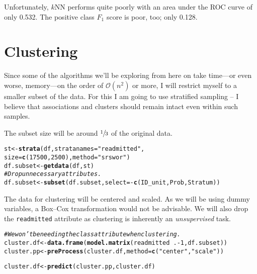 \documentclass{article}\usepackage[]{graphicx}\usepackage[]{color}
\makeatletter
\newcommand{\hlnum}[1]{\textcolor[rgb]{0.686,0.059,0.569}{#1}}%
\newcommand{\hlstr}[1]{\textcolor[rgb]{0.192,0.494,0.8}{#1}}%
\newcommand{\hlcom}[1]{\textcolor[rgb]{0.678,0.584,0.686}{\textit{#1}}}%
\newcommand{\hlopt}[1]{\textcolor[rgb]{0,0,0}{#1}}%
\newcommand{\hlstd}[1]{\textcolor[rgb]{0.345,0.345,0.345}{#1}}%
\newcommand{\hlkwb}[1]{\textcolor[rgb]{0.69,0.353,0.396}{#1}}%
\newcommand{\hlkwc}[1]{\textcolor[rgb]{0.333,0.667,0.333}{#1}}%
\newcommand{\hlkwd}[1]{\textcolor[rgb]{0.737,0.353,0.396}{\textbf{#1}}}%
\newenvironment{kframe}{%
 \def\at@end@of@kframe{}%
 \ifinner\ifhmode%
  \def\at@end@of@kframe{\end{minipage}}%
  \begin{minipage}{\columnwidth}%
 \fi\fi%
 \def\FrameCommand##1{\hskip\@totalleftmargin \hskip-\fboxsep
 \colorbox{shadecolor}{##1}\hskip-\fboxsep
     \hskip-\linewidth \hskip-\@totalleftmargin \hskip\columnwidth}%
 \MakeFramed {\advance\hsize-\width
   \@totalleftmargin\z@ \linewidth\hsize
   \@setminipage}}%
 {\par\unskip\endMakeFramed%
 \at@end@of@kframe}
\newenvironment{knitrout}{}{} %
\makeatother
\begin{document}
Unfortunately, $k$NN performs quite poorly with an area under the ROC curve of
only \num{0.532}.  The positive class $F_1$ score is poor, too; only
\num{0.128}.

\section{Clustering}\label{sec:cluster}

Since some of the algorithms we'll be exploring from here on take time---or even
worse, memory---on the order of $\mathcal O\left(n^2\right)$ or more, I will
restrict myself to a smaller subset of the data.  For this I am going to use
stratified sampling -- I believe that associations and clusters should remain
intact even within such samples.

The subset size will be around $\sfrac{1}{3}$ of the original data.

\begin{knitrout}
\color{fgcolor}\begin{kframe}
\begin{alltt}
\hlstd{st} \hlkwb{<-} \hlkwd{strata}\hlstd{(df,} \hlkwc{stratanames}\hlstd{=}\hlstr{"readmitted"}\hlstd{,}
             \hlkwc{size}\hlstd{=}\hlkwd{c}\hlstd{(}\hlnum{17500}\hlstd{,} \hlnum{2500}\hlstd{),} \hlkwc{method}\hlstd{=}\hlstr{"srswor"}\hlstd{)}
\hlstd{df.subset} \hlkwb{<-} \hlkwd{getdata}\hlstd{(df, st)}
\hlcom{# Drop unnecessary attributes.}
\hlstd{df.subset} \hlkwb{<-} \hlkwd{subset}\hlstd{(df.subset,} \hlkwc{select}\hlstd{=}\hlopt{-}\hlkwd{c}\hlstd{(ID_unit, Prob, Stratum))}
\end{alltt}
\end{kframe}
\end{knitrout}

The data for clustering will be centered and scaled.  As we will be using dummy
variables, a Box--Cox transformation would not be advisable.  We will also drop
the \texttt{readmitted} attribute as clustering is inherently an
\emph{unsupervised} task.

\begin{knitrout}
\color{fgcolor}\begin{kframe}
\begin{alltt}
\hlcom{# We won't be needing the class attribute when clustering.}
\hlstd{cluster.df} \hlkwb{<-} \hlkwd{data.frame}\hlstd{(}\hlkwd{model.matrix}\hlstd{(readmitted} \hlopt{~} \hlstd{.} \hlopt{-} \hlnum{1}\hlstd{, df.subset))}
\hlstd{cluster.pp} \hlkwb{<-} \hlkwd{preProcess}\hlstd{(cluster.df,} \hlkwc{method}\hlstd{=}\hlkwd{c}\hlstd{(}\hlstr{"center"}\hlstd{,} \hlstr{"scale"}\hlstd{))}
\end{alltt}


{\ttfamily\noindent{}}\begin{alltt}
\hlstd{cluster.df} \hlkwb{<-} \hlkwd{predict}\hlstd{(cluster.pp, cluster.df)}
\end{alltt}
\end{kframe}
\end{knitrout}
\end{document}
